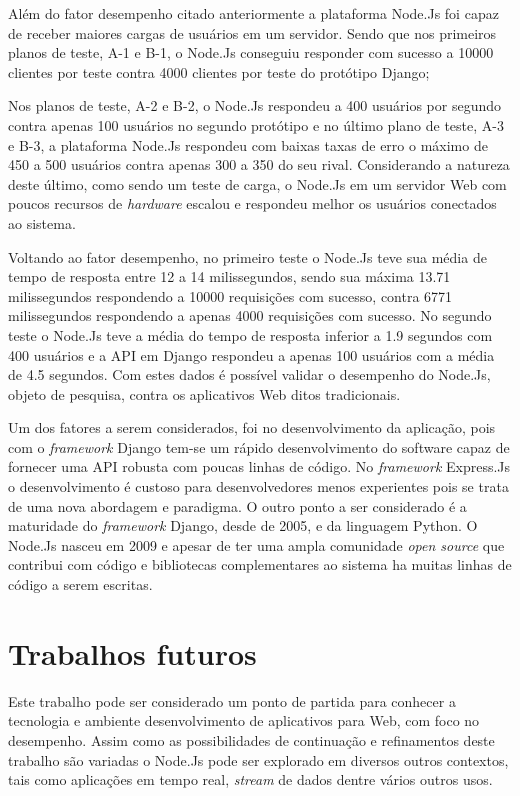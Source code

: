   Além do fator desempenho citado anteriormente a plataforma Node.Js foi capaz
  de receber maiores cargas de usuários em um servidor. Sendo que nos 
  primeiros planos de teste, A-1 e B-1, o Node.Js conseguiu responder com sucesso a 10000 clientes por teste contra 
  4000 clientes por teste do protótipo Django; 
  
  Nos planos de teste, A-2 e B-2, o Node.Js respondeu a 400 usuários por segundo contra apenas 100 usuários no segundo protótipo e 
  no último plano de teste, A-3 e B-3, a plataforma Node.Js respondeu com baixas taxas de erro
  o máximo de 450 a 500 usuários contra apenas 300 a 350 do seu rival. Considerando a natureza deste último, como
  sendo um teste de carga, o Node.Js em um servidor Web com poucos recursos de \textit{hardware} escalou e respondeu melhor
  os usuários conectados ao sistema.
  
  Voltando ao fator desempenho, no primeiro teste o Node.Js teve sua média de tempo de resposta entre 12 a 14 milissegundos, sendo 
  sua máxima 13.71 milissegundos respondendo a 10000 requisições com sucesso, contra 6771 milissegundos respondendo a apenas 4000
  requisições com sucesso. No segundo teste o Node.Js teve a média do tempo de resposta inferior a  1.9 segundos com 400 usuários
  e a API em Django respondeu a apenas 100 usuários com a média de 4.5 segundos. Com estes dados é possível validar o desempenho
  do Node.Js, objeto de pesquisa, contra os aplicativos Web ditos tradicionais.
  
  Um dos fatores a serem considerados, foi no desenvolvimento da aplicação, pois com o \textit{framework} Django tem-se um rápido 
  desenvolvimento do software capaz de fornecer uma API robusta com poucas linhas de código. No \textit{framework} Express.Js o desenvolvimento
  é custoso para desenvolvedores menos experientes pois se trata de uma nova abordagem e paradigma. 
  O outro ponto a ser considerado é a maturidade do \textit{framework} Django, desde de 2005, e da linguagem Python. O Node.Js
  nasceu em 2009 e apesar de ter uma ampla comunidade \textit{open source} que contribui com código e bibliotecas complementares
  ao sistema ha muitas linhas de código a serem escritas. 
 
  
\section{Trabalhos futuros}
\label{trabalhos-furutos}
  
  Este trabalho pode ser considerado um ponto de partida para conhecer a tecnologia e ambiente desenvolvimento de aplicativos 
  para Web, com foco no desempenho. Assim como as possibilidades de continuação e refinamentos deste trabalho 
  são variadas o Node.Js pode ser explorado em diversos outros contextos, tais como aplicações em tempo real, \textit{stream} de dados dentre 
  vários outros usos.
  

